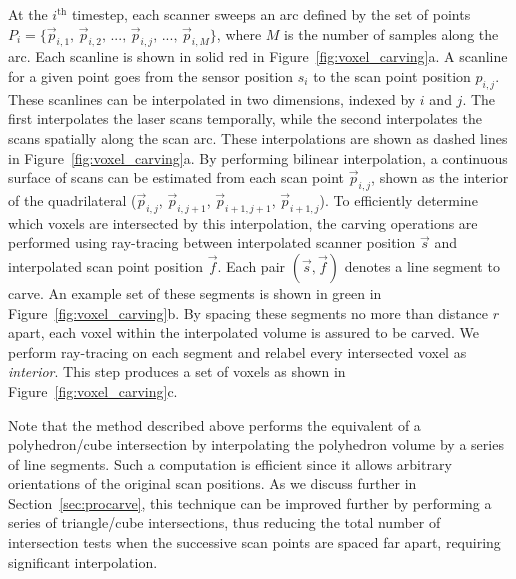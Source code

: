 \documentclass[12pt,onecolumn,oneside]{book}
\begin{document}
At the $i^{\text{th}}$ timestep, each scanner sweeps an arc defined by the set of points $P_{i} = \{\vec{p}_{i,1},\,\vec{p}_{i,2},\,...,\,\vec{p}_{i,j},\,...,\,\vec{p}_{i,M}\}$, where $M$ is the number of samples along the arc.  Each scanline is shown in solid red in Figure~\ref{fig:voxel_carving}a.  A scanline for a given point goes from the sensor position $s_i$ to the scan point position $p_{i,j}$.  These scanlines can be interpolated in two dimensions, indexed by $i$ and $j$.  The first interpolates the laser scans temporally, while the second interpolates the scans spatially along the scan arc.  These interpolations are shown as dashed lines in Figure~\ref{fig:voxel_carving}a.  By performing bilinear interpolation, a continuous surface of scans can be estimated from each scan point $\vec{p}_{i,j}$, shown as the interior of the quadrilateral ($\vec{p}_{i,j}$, $\vec{p}_{i,j+1}$, $\vec{p}_{i+1,j+1}$, $\vec{p}_{i+1,j}$).  To efficiently determine which voxels are intersected by this interpolation, the carving operations are performed using ray-tracing between interpolated scanner position $\vec{s}$ and interpolated scan point position $\vec{f}$.  Each pair $(\vec{s}, \vec{f})$ denotes a line segment to carve.  An example set of these segments is shown in green in Figure~\ref{fig:voxel_carving}b.  By spacing these segments no more than distance $r$ apart, each voxel within the interpolated volume is assured to be carved.  We perform ray-tracing on each segment and relabel every intersected voxel as {\it interior}.  This step produces a set of voxels as shown in Figure~\ref{fig:voxel_carving}c.

Note that the method described above performs the equivalent of a polyhedron/cube intersection by interpolating the polyhedron volume by a series of line segments.  Such a computation is efficient since it allows arbitrary orientations of the original scan positions.  As we discuss further in Section~\ref{sec:procarve}, this technique can be improved further by performing a series of triangle/cube intersections, thus reducing the total number of intersection tests when the successive scan points are spaced far apart, requiring significant interpolation.
\end{document}
